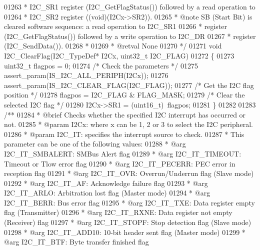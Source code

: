 \begin{DoxyCode}
01263 \textcolor{comment}{  *          I2C\_SR1 register (I2C\_GetFlagStatus()) followed by a read operation to }
01264 \textcolor{comment}{  *          I2C\_SR2 register ((void)(I2Cx->SR2)).}
01265 \textcolor{comment}{  * @note   SB (Start Bit) is cleared software sequence: a read operation to I2C\_SR1}
01266 \textcolor{comment}{  *          register (I2C\_GetFlagStatus()) followed by a write operation to I2C\_DR}
01267 \textcolor{comment}{  *          register (I2C\_SendData()).}
01268 \textcolor{comment}{  *  }
01269 \textcolor{comment}{  * @retval None}
01270 \textcolor{comment}{  */}
01271 \textcolor{keywordtype}{void} I2C_ClearFlag(I2C\_TypeDef* I2Cx, uint32\_t I2C\_FLAG)
01272 \{
01273   uint32\_t flagpos = 0;
01274   \textcolor{comment}{/* Check the parameters */}
01275   assert_param(IS\_I2C\_ALL\_PERIPH(I2Cx));
01276   assert_param(IS\_I2C\_CLEAR\_FLAG(I2C\_FLAG));
01277   \textcolor{comment}{/* Get the I2C flag position */}
01278   flagpos = I2C\_FLAG & FLAG_MASK;
01279   \textcolor{comment}{/* Clear the selected I2C flag */}
01280   I2Cx->SR1 = (uint16\_t)~flagpos;
01281 \}
01282 
01283 \textcolor{comment}{/**}
01284 \textcolor{comment}{  * @brief  Checks whether the specified I2C interrupt has occurred or not.}
01285 \textcolor{comment}{  * @param  I2Cx: where x can be 1, 2 or 3 to select the I2C peripheral.}
01286 \textcolor{comment}{  * @param  I2C\_IT: specifies the interrupt source to check. }
01287 \textcolor{comment}{  *          This parameter can be one of the following values:}
01288 \textcolor{comment}{  *            @arg I2C\_IT\_SMBALERT: SMBus Alert flag}
01289 \textcolor{comment}{  *            @arg I2C\_IT\_TIMEOUT: Timeout or Tlow error flag}
01290 \textcolor{comment}{  *            @arg I2C\_IT\_PECERR: PEC error in reception flag}
01291 \textcolor{comment}{  *            @arg I2C\_IT\_OVR: Overrun/Underrun flag (Slave mode)}
01292 \textcolor{comment}{  *            @arg I2C\_IT\_AF: Acknowledge failure flag}
01293 \textcolor{comment}{  *            @arg I2C\_IT\_ARLO: Arbitration lost flag (Master mode)}
01294 \textcolor{comment}{  *            @arg I2C\_IT\_BERR: Bus error flag}
01295 \textcolor{comment}{  *            @arg I2C\_IT\_TXE: Data register empty flag (Transmitter)}
01296 \textcolor{comment}{  *            @arg I2C\_IT\_RXNE: Data register not empty (Receiver) flag}
01297 \textcolor{comment}{  *            @arg I2C\_IT\_STOPF: Stop detection flag (Slave mode)}
01298 \textcolor{comment}{  *            @arg I2C\_IT\_ADD10: 10-bit header sent flag (Master mode)}
01299 \textcolor{comment}{  *            @arg I2C\_IT\_BTF: Byte transfer finished flag}

\end{DoxyCode}
